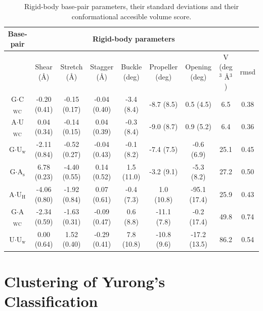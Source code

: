 \begin{table}
\begin{center}
\begin{tabular}{|c|c|c|c|c|c|c|c|c|}
\hline
Base-pair & \multicolumn{7}{c|}{Rigid-body parameters} \\
\hline
 & Shear (\AA) & Stretch (\AA) & Stagger (\AA) & Buckle (deg) &
Propeller (deg) & Opening (deg) & V (deg$^{\text{3}}$
\AA$^{\text{3}}$) & rmsd \\
\hline
G$\cdot$C$_{\text{WC}}$ & -0.20 (0.41) & -0.15 (0.17) & -0.04 (0.40) & -3.4 (8.4)  &  -8.7  (8.5) &  0.5  (4.5)  & 6.5   & 0.38\\
A$\cdot$U$_{\text{WC}}$ &  0.04 (0.34) & -0.14 (0.15) &  0.04 (0.39) & -0.3 (8.4)  &  -9.0  (8.7) &  0.9  (5.2)  & 6.4   & 0.36\\
G$\cdot$U$_{\text{w}}$  & -2.11 (0.84) & -0.52 (0.27) & -0.04 (0.43) & -0.1 (8.2)  &  -7.4  (7.5) & -0.6  (6.9)  & 25.1  & 0.45\\
G$\cdot$A$_{\text{s}}$  &  6.78 (0.23) & -4.40 (0.55) &  0.14 (0.52) &  1.5 (11.0) &  -3.2  (9.1) & -5.3  (8.2)  & 27.2  & 0.50\\
A$\cdot$U$_{\text{H}}$  & -4.06 (0.80) & -1.92 (0.84) &  0.07 (0.61) & -0.4 (7.3)  &   1.0 (10.8) & -95.1 (17.4) & 25.9  & 0.43\\
G$\cdot$A$_{\text{WC}}$ & -2.34 (0.59) & -1.63 (0.31) & -0.09 (0.47) &  0.6 (8.8)  & -11.1  (7.8) & -0.2  (17.4) & 49.8  & 0.74\\
U$\cdot$U$_{\text{w}}$  &  0.00 (0.64) &  1.52 (0.40) & -0.29 (0.41) &  7.8 (10.8) & -10.8  (9.6) & -17.2 (13.5) & 86.2  & 0.54\\
\hline
\end{tabular}
\caption{Rigid-body base-pair parameters, their standard deviations
  and their conformational accesible volume score.}
\label{tab:bppar}
\end{center}
\end{table}




\section{Clustering of Yurong's Classification}



